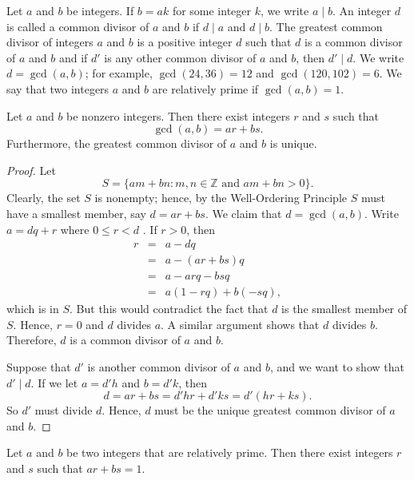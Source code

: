 Let $a$ and $b$ be integers.  If $b = ak$ for some integer $k$, we write $a \mid b$\label{divides}.  An integer $d$ is called a {\bfi  common divisor\/} of $a$ and $b$ if $d \mid a$ and $d \mid b$.  The {\bfi greatest common divisor\/} of integers $a$ and $b$ is a positive integer $d$ such that $d$ is a common divisor  of $a$ and $b$ and if $d'$ is any other common divisor of $a$ and $b$, then $d' \mid d$.  We write $d = \gcd(a, b)$\label{greatestcd}; for example, $\gcd( 24, 36) = 12$ and $\gcd(120, 102) = 6$.  We say that two integers $a$ and $b$ are {\bfi relatively prime\/} if $\gcd( a, b ) = 1$. 

\begin{theorem}\label{integers_theorem_gcd}
Let $a$ and $b$ be nonzero integers. Then there exist integers $r$ and $s$ such that
$$
\gcd( a, b) = ar + bs.
$$
Furthermore, the greatest common divisor of $a$ and $b$ is unique.
\end{theorem}
 
\begin{proof}
Let
$$
S = \{ am + bn : m, n \in {\mathbb Z} \mbox{ and } am + bn	> 0 \}.
$$
Clearly, the set $S$ is nonempty; hence, by the Well-Ordering Principle $S$ must have a smallest member, say $d = ar + bs$.  We claim that $d = \gcd( a, b)$.  Write $a = dq + r$ where $0 \leq r < d$ . If $r > 0$, then 
\begin{eqnarray*}
r 
& = & a - dq \\
& = & a - (ar + bs)q \\
& = & a - arq - bsq \\
& = & a( 1 - rq ) + b( -sq ),
\end{eqnarray*}
which is in $S$.  But this would contradict the fact that $d$ is the smallest member of $S$.  Hence, $r = 0$ and $d$ divides $a$.  A similar argument shows that $d$ divides $b$.  Therefore, $d$ is a common divisor of $a$ and $b$.

Suppose that $d'$ is another common divisor of $a$ and $b$, and we want to show that $d' \mid d$. If we let $a = d'h$ and $b = d'k$, then
$$
d = ar + bs = d'hr + d'ks = d'(hr + ks).
$$
So $d'$ must divide $d$. Hence, $d$ must be the unique greatest common divisor of $a$ and $b$. 
\end{proof}

\begin{corollary}\label{integers_theorem_5}
Let $a$ and $b$ be two integers that are relatively prime. Then there exist  integers $r$ and $s$ such that $ar + bs = 1$. 
\end{corollary}
 
